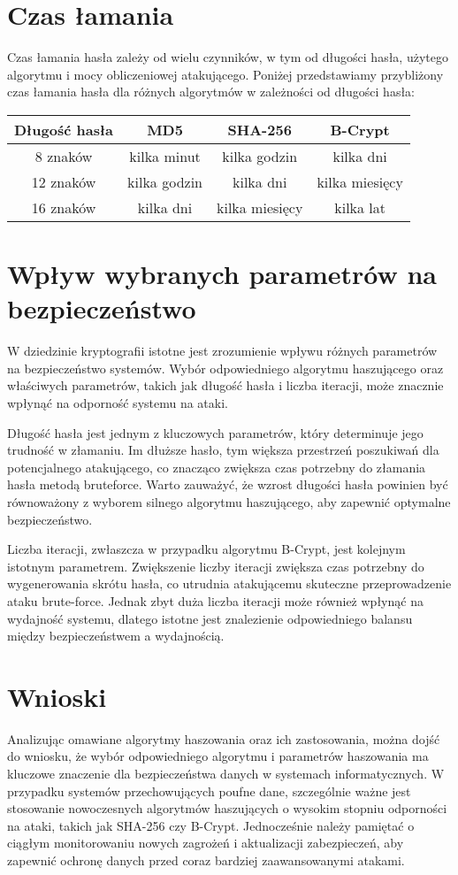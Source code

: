 \documentclass[10pt,a4paper]{article}
\begin{document}
\section{Czas łamania}
Czas łamania hasła zależy od wielu czynników, w tym od długości hasła, użytego algorytmu i mocy obliczeniowej atakującego. Poniżej przedstawiamy przybliżony czas łamania hasła dla różnych algorytmów w zależności od długości hasła:

\begin{center}
\begin{tabular}{|c|c|c|c|}
\hline
Długość hasła & MD5 & SHA-256 & B-Crypt \\
\hline
8 znaków & kilka minut & kilka godzin & kilka dni \\
\hline
12 znaków & kilka godzin & kilka dni & kilka miesięcy \\
\hline
16 znaków & kilka dni & kilka miesięcy & kilka lat \\
\hline
\end{tabular}
\end{center}


\section{Wpływ wybranych parametrów na bezpieczeństwo}
W dziedzinie kryptografii istotne jest zrozumienie wpływu różnych parametrów na bezpieczeństwo systemów. Wybór odpowiedniego algorytmu haszującego oraz właściwych parametrów, takich jak długość hasła i liczba iteracji, może znacznie wpłynąć na odporność systemu na ataki.

Długość hasła jest jednym z kluczowych parametrów, który determinuje jego trudność w złamaniu. Im dłuższe hasło, tym większa przestrzeń poszukiwań dla potencjalnego atakującego, co znacząco zwiększa czas potrzebny do złamania hasła metodą bruteforce. Warto zauważyć, że wzrost długości hasła powinien być równoważony z wyborem silnego algorytmu haszującego, aby zapewnić optymalne bezpieczeństwo.

Liczba iteracji, zwłaszcza w przypadku algorytmu B-Crypt, jest kolejnym istotnym parametrem. Zwiększenie liczby iteracji zwiększa czas potrzebny do wygenerowania skrótu hasła, co utrudnia atakującemu skuteczne przeprowadzenie ataku brute-force. Jednak zbyt duża liczba iteracji może również wpłynąć na wydajność systemu, dlatego istotne jest znalezienie odpowiedniego balansu między bezpieczeństwem a wydajnością.

\section{Wnioski}
Analizując omawiane algorytmy haszowania oraz ich zastosowania, można dojść do wniosku, że wybór odpowiedniego algorytmu i parametrów haszowania ma kluczowe znaczenie dla bezpieczeństwa danych w systemach informatycznych. W przypadku systemów przechowujących poufne dane, szczególnie ważne jest stosowanie nowoczesnych algorytmów haszujących o wysokim stopniu odporności na ataki, takich jak SHA-256 czy B-Crypt. Jednocześnie należy pamiętać o ciągłym monitorowaniu nowych zagrożeń i aktualizacji zabezpieczeń, aby zapewnić ochronę danych przed coraz bardziej zaawansowanymi atakami.
\end{document}
